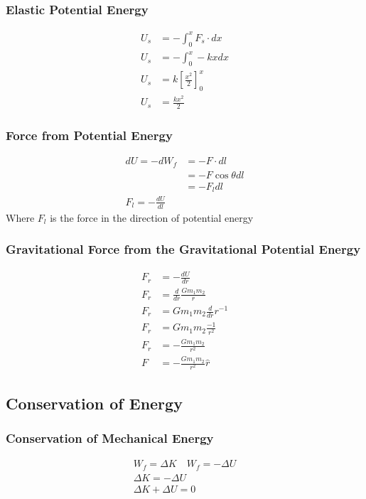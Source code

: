 \documentclass[../Notes.tex]{subfiles}
\begin{document}
\subsubsection{Elastic Potential Energy}
\begin{align*}
	U_s &= - \int_{0}^{x} F_s \cdot dx \\
	U_s &= - \int_{0}^{x} -kx dx \\
	U_s &= k \left[ \frac{x^2}2 \right]_0^x \\
	U_s &= \frac{kx^2}{2}
\end{align*}

\subsubsection{Force from Potential Energy}
\begin{align*}
	dU = -dW_f &= - F \cdot dl \\
	&= -F \cos \theta dl \\
	&= -F_l dl \\
	F_l = -\frac{dU}{dl}
\end{align*}
Where $F_l$ is the force in the direction of potential energy

\subsubsection{Gravitational Force from the Gravitational Potential Energy}
\begin{align*}
	F_r &= -\frac{dU}{dr} \\
	F_r &= \frac{d}{dr} \frac{G m_1 m_2}{r} \\
	F_r &= G m_1 m_2 \frac{d}{dr} r^{-1} \\
	F_r &= G m_1 m_2 \frac{-1}{r^2} \\
	F_r &= - \frac{G m_1 m_2}{r^2} \\
	F &= - \frac{G m_1 m_2}{r^2} \hat r
\end{align*}

\subsection{Conservation of Energy}

\subsubsection{Conservation of Mechanical Energy}
\begin{align*}
	W_f = \Delta K \quad W_f = -\Delta U \\
	\Delta K = - \Delta U \\
	\Delta K + \Delta U = 0
\end{align*}
\end{document}
